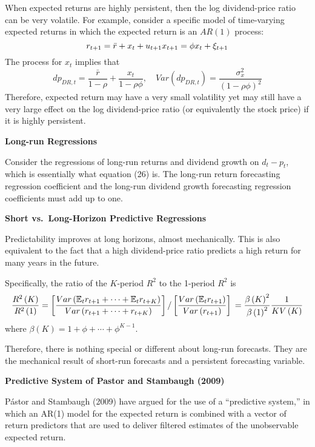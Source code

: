 \documentclass[
]{book}
\begin{document}
When expected returns are highly persistent, then the log dividend-price ratio can be very volatile. For example, consider a specific model of time-varying expected returns in which the expected return is an \(AR\left(1\right)\) process:
\[
r_{t+1}=\bar{r}+x_{t}+u_{t+1}\\x_{t+1}=\phi x_{t}+\xi_{t+1}
\]
The process for \(x_t\) implies that
\[
dp_{DR,t}=\frac{\bar{r}}{1-\rho}+\frac{x_{t}}{1-\rho\phi},\quad Var\left(dp_{DR,t}\right)=\frac{\sigma_{x}^{2}}{\left(1-\rho\phi\right)^{2}}
\]
Therefore, expected return may have a very small volatility yet may still have a very large effect on the log dividend-price ratio (or equivalently the stock price) if it is highly persistent.

\textbf{Long-run Regressions}

Consider the regressions of long-run returns and dividend growth on \(d_t-p_t\), which is essentially what equation (26) is. The long-run return forecasting regression coefficient and the long-run dividend growth forecasting regression coefficients must add up to one.

\textbf{Short vs.~Long-Horizon Predictive Regressions}

Predictability improves at long horizons, almost mechanically. This is also equivalent to the fact that a high dividend-price ratio predicts a high return for many years in the future.

Specifically, the ratio of the \(K\)-period \(R^{2}\) to the 1-period \(R^{2}\) is
\[
\frac{R^{2}\left(K\right)}{R^{2}\left(1\right)}=\left[\frac{Var\left(\mathbb{E}_{t}r_{t+1}+\cdots+\mathbb{E}_{t}r_{t+K}\right)}{Var\left(r_{t+1}+\cdots+r_{t+K}\right)}\right]/\left[\frac{Var\left(\mathbb{E}_{t}r_{t+1}\right)}{Var\left(r_{t+1}\right)}\right]\\=\frac{\beta\left(K\right)^{2}}{\beta\left(1\right)^{2}}\frac{1}{KV\left(K\right)}
\]
where \(\beta\left(K\right)=1+\phi+\cdots+\phi^{K-1}\).

Therefore, there is nothing special or different about long-run forecasts. They are the mechanical result of short-run forecasts and a persistent forecasting variable.

\textbf{Predictive System of Pastor and Stambaugh (2009)}

Pástor and Stambaugh (2009) have argued for the use of a ``predictive system,'' in which an AR(1) model for the expected return is combined with a vector of return predictors that are used to deliver filtered estimates of the unobservable expected return.
\end{document}

